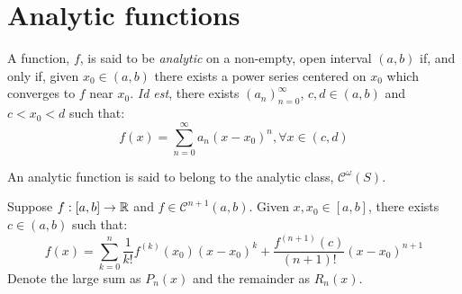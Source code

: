 \section{Analytic functions}

\begin{definition}
    A function, $f$, is said to be \emph{analytic} on a non-empty, open interval $(a,b)$ if, and only if, given $x_0 \in (a,b)$ there exists a power series centered on $x_0$ which converges to $f$ near $x_0$. \emph{Id est}, there exists $(a_n)_{n=0}^\infty$, $c, d \in (a,b)$ and $c < x_0 < d$ such that:
    \begin{equation*}
        f(x) = \sum \limits_{n=0}^\infty a_n (x - x_0)^n, \forall x \in (c,d)
    \end{equation*}
\end{definition}

\begin{remark}
    An analytic function is said to belong to the analytic class, $\mathcal{C}^\omega(S)$.
\end{remark}

\begin{theorem}
    Suppose $f: [a,b] \to \mathbb{R}$ and $f \in \mathcal{C}^{n+1}(a,b)$. Given $x, x_0 \in [a,b]$, there exists $c \in (a,b)$ such that:
    \begin{equation}
        f(x) = \sum \limits_{k = 0}^n \frac{1}{k!}f^{(k)}(x_0)(x-x_0)^k + \frac{f^{(n+1)}(c)}{(n+1)!}(x-x_0)^{n+1}
    \end{equation}
    Denote the large sum as $P_n(x)$ and the remainder as $R_n(x)$.
\end{theorem}

